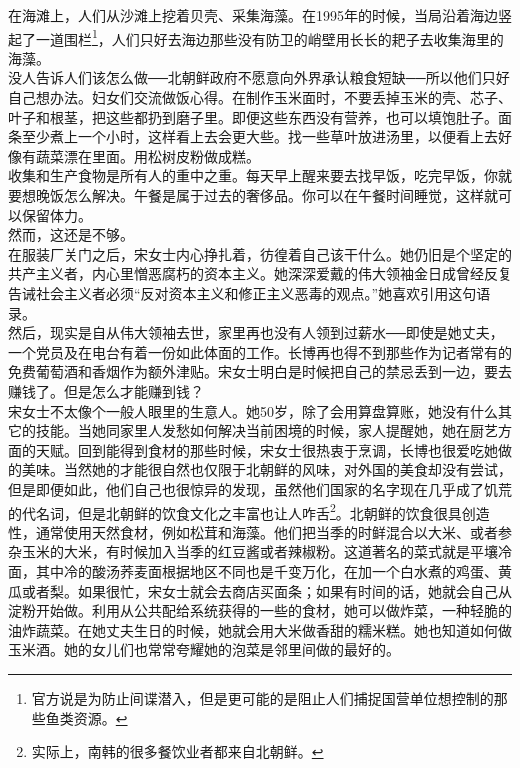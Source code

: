在海滩上，人们从沙滩上挖着贝壳、采集海藻。在1995年的时候，当局沿着海边竖起了一道围栏\footnote{官方说是为防止间谍潜入，但是更可能的是阻止人们捕捉国营单位想控制的那些鱼类资源。}，人们只好去海边那些没有防卫的峭壁用长长的耙子去收集海里的海藻。\\

没人告诉人们该怎么做──北朝鲜政府不愿意向外界承认粮食短缺──所以他们只好自己想办法。妇女们交流做饭心得。在制作玉米面时，不要丢掉玉米的壳、芯子、叶子和根茎，把这些都扔到磨子里。即便这些东西没有营养，也可以填饱肚子。面条至少煮上一个小时，这样看上去会更大些。找一些草叶放进汤里，以便看上去好像有蔬菜漂在里面。用松树皮粉做成糕。\\

收集和生产食物是所有人的重中之重。每天早上醒来要去找早饭，吃完早饭，你就要想晚饭怎么解决。午餐是属于过去的奢侈品。你可以在午餐时间睡觉，这样就可以保留体力。\\

然而，这还是不够。\\

在服装厂关门之后，宋女士内心挣扎着，彷徨着自己该干什么。她仍旧是个坚定的共产主义者，内心里憎恶腐朽的资本主义。她深深爱戴的伟大领袖金日成曾经反复告诫社会主义者必须“反对资本主义和修正主义恶毒的观点。”她喜欢引用这句语录。\\

然后，现实是自从伟大领袖去世，家里再也没有人领到过薪水──即使是她丈夫，一个党员及在电台有着一份如此体面的工作。长博再也得不到那些作为记者常有的免费葡萄酒和香烟作为额外津贴。宋女士明白是时候把自己的禁忌丢到一边，要去赚钱了。但是怎么才能赚到钱？\\

宋女士不太像个一般人眼里的生意人。她50岁，除了会用算盘算账，她没有什么其它的技能。当她同家里人发愁如何解决当前困境的时候，家人提醒她，她在厨艺方面的天赋。回到能得到食材的那些时候，宋女士很热衷于烹调，长博也很爱吃她做的美味。当然她的才能很自然也仅限于北朝鲜的风味，对外国的美食却没有尝试，但是即便如此，他们自己也很惊异的发现，虽然他们国家的名字现在几乎成了饥荒的代名词，但是北朝鲜的饮食文化之丰富也让人咋舌\footnote{实际上，南韩的很多餐饮业者都来自北朝鲜。}。北朝鲜的饮食很具创造性，通常使用天然食材，例如松茸和海藻。他们把当季的时鲜混合以大米、或者参杂玉米的大米，有时候加入当季的红豆酱或者辣椒粉。这道著名的菜式就是平壤冷面，其中冷的酸汤荞麦面根据地区不同也是千变万化，在加一个白水煮的鸡蛋、黄瓜或者梨。如果很忙，宋女士就会去商店买面条；如果有时间的话，她就会自己从淀粉开始做。利用从公共配给系统获得的一些的食材，她可以做炸菜，一种轻脆的油炸蔬菜。在她丈夫生日的时候，她就会用大米做香甜的糯米糕。她也知道如何做玉米酒。她的女儿们也常常夸耀她的泡菜是邻里间做的最好的。\\

